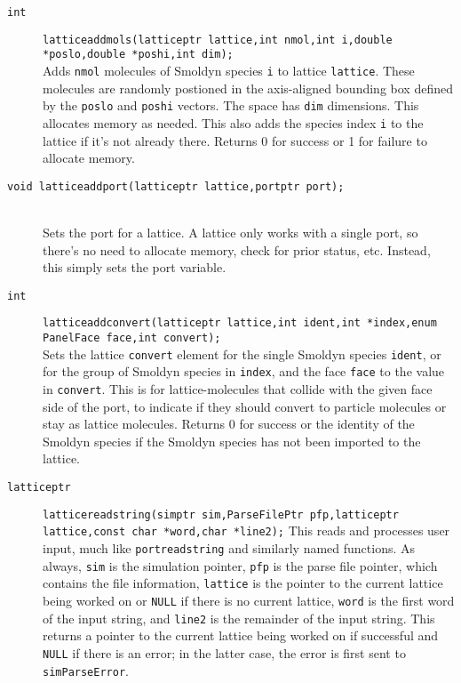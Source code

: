 \documentclass {book}
\begin{document}
\begin{description}
\item[\texttt{int}]
\texttt{latticeaddmols(latticeptr lattice,int nmol,int i,double *poslo,double *poshi,int dim);}
\hfill \\
Adds \texttt{nmol} molecules of Smoldyn species \texttt{i} to lattice \texttt{lattice}.  These molecules are randomly postioned in the axis-aligned bounding box defined by the \texttt{poslo} and \texttt{poshi} vectors.  The space has \texttt{dim} dimensions.  This allocates memory as needed.  This also adds the species index \texttt{i} to the lattice if it's not already there.  Returns 0 for success or 1 for failure to allocate memory.

\item[\texttt{void latticeaddport(latticeptr lattice,portptr port);}]
\hfill \\
Sets the port for a lattice.  A lattice only works with a single port, so there's no need to allocate memory, check for prior status, etc.  Instead, this simply sets the port variable.

\item[\texttt{int}]
\texttt{latticeaddconvert(latticeptr lattice,int ident,int *index,enum PanelFace face,int convert);}
\hfill \\
Sets the lattice \texttt{convert} element for the single Smoldyn species \texttt{ident}, or for the group of Smoldyn species in \texttt{index}, and the face \texttt{face} to the value in \texttt{convert}.  This is for lattice-molecules that collide with the given face side of the port, to indicate if they should convert to particle molecules or stay as lattice molecules.  Returns 0 for success or the identity of the Smoldyn species if the Smoldyn species has not been imported to the lattice.

\item[\texttt{latticeptr}]
\texttt{latticereadstring(simptr sim,ParseFilePtr pfp,latticeptr lattice,const char *word,char *line2);}
This reads and processes user input, much like \texttt{portreadstring} and similarly named functions.  As always, \texttt{sim} is the simulation pointer, \texttt{pfp} is the parse file pointer, which contains the file information, \texttt{lattice} is the pointer to the current lattice being worked on or \texttt{NULL} if there is no current lattice, \texttt{word} is the first word of the input string, and \texttt{line2} is the remainder of the input string.  This returns a pointer to the current lattice being worked on if successful and \texttt{NULL} if there is an error; in the latter case, the error is first sent to \texttt{simParseError}.  


\end{description}
\end{document}
